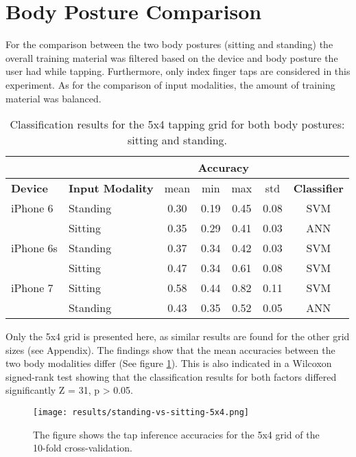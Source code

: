 \section{Body Posture Comparison}
For the comparison between the two body postures (sitting and standing) the overall training material was filtered based on the device and body posture the user had while tapping. Furthermore, only index finger taps are considered in this experiment. As for the comparison of input modalities, the amount of training material was balanced.

\begin{table}[h!]
  \centering
\begin{tabular}{|l|l|c|c|c|c|c|}
  \cline{3-6}
  \multicolumn{2}{c}{} & \multicolumn{4}{|c|}{\textbf{Accuracy}}  \\
  \hline
  \textbf{Device} & \textbf{Input Modality} & mean &   min &   max  & std &  \textbf{Classifier} \\
  \hline
  iPhone 6 & Standing &      0.30 &     0.19 &     0.45 &     0.08 &  SVM \\
  & Sitting &      0.35 &     0.29 &     0.41 &     0.03 &  ANN \\
  \hline
iPhone 6s   & Standing &      0.37 &     0.34 &     0.42 &     0.03 &  SVM \\
& Sitting &      0.47 &     0.34 &     0.61 &     0.08 &  SVM \\
  \hline
  iPhone 7 &    Sitting     &      0.58 &     0.44 &     0.82 &     0.11 &  SVM\\
  & Standing &      0.43 &     0.35 &     0.52 &     0.05 &  ANN \\
  \hline
\end{tabular}
  \caption{Classification results for the 5x4 tapping grid for both body postures: sitting and standing.}
\end{table}

Only the 5x4 grid is presented here, as similar results are found for the other grid sizes (see Appendix). The findings show that the mean accuracies between the two body modalities differ (See figure \ref{fig:bodypos5x4}). This is also indicated in a Wilcoxon signed-rank test showing that the classification results for both factors differed significantly Z = 31, p > 0.05.

\begin{figure}[h!]
  \centering
  \texttt{[image: results/standing-vs-sitting-5x4.png]}
  \caption{The figure shows the tap inference accuracies for the 5x4 grid of the 10-fold cross-validation.} \label{fig:bodypos5x4}
\end{figure}

